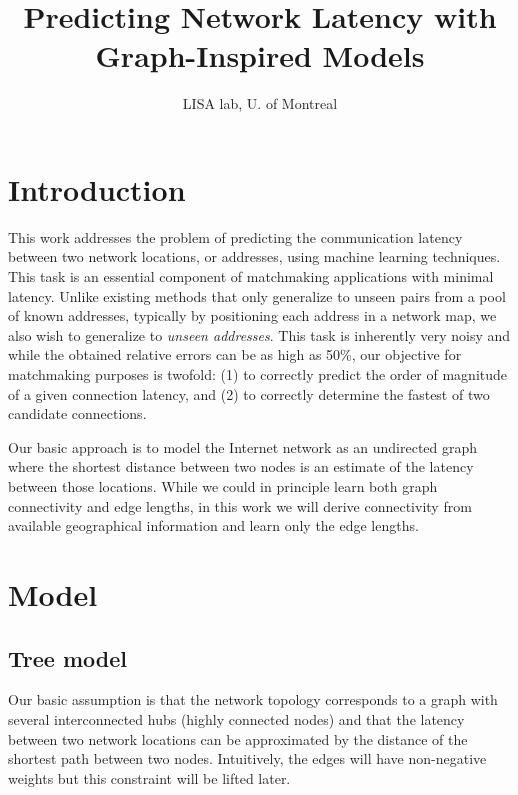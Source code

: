\documentclass[10pt,a4paper,notitlepage,twocolumn]{article}
\author{LISA lab, U. of Montreal}
\title{Predicting Network Latency with Graph-Inspired Models}
\begin{document}
\maketitle

\section{Introduction}

This work addresses the problem of predicting the communication latency between two network locations, or addresses, using machine learning techniques.
This task is an essential component of matchmaking applications with minimal latency.
Unlike existing methods that only generalize to unseen pairs from a pool of known addresses, typically by positioning each address in a network map, we also wish to generalize to \emph{unseen addresses}.
%
This task is inherently very noisy and while the obtained relative errors can be as high as 50\%,
our objective for matchmaking purposes is twofold: (1) to correctly predict the order of magnitude of a given connection latency, and (2) to correctly determine the fastest of two candidate connections.

Our basic approach is to model the Internet network as an undirected graph where the shortest distance between two nodes is an estimate of the latency between those locations.
While we could in principle learn both graph connectivity and edge lengths, in this work we will derive connectivity from available geographical information and learn only the edge lengths.


\section{Model}

\subsection{Tree model}

Our basic assumption is that the network topology corresponds to a graph with several interconnected hubs (highly connected nodes) and that the latency between two network locations can be approximated by the distance of the shortest path between two nodes.
Intuitively, the edges will have non-negative weights but this constraint will be lifted later.
\end{document}
